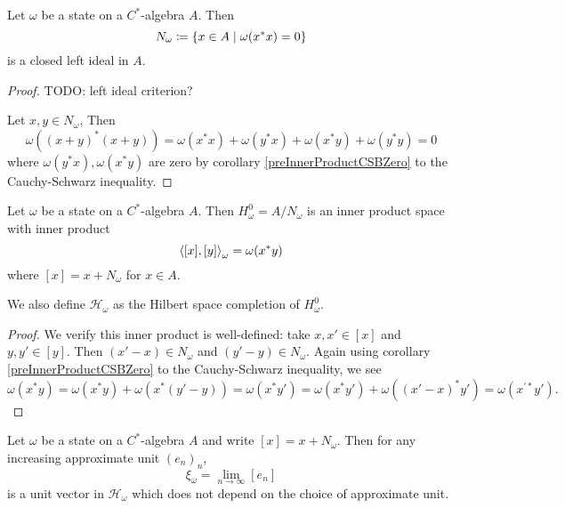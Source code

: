 \begin{lemma}
Let $\omega$ be a state on a $C^*$-algebra $A$. Then
\[ N_\omega \coloneqq \left\{ x\in A \;\middle|\; \omega(x^*x) = 0 \right\} \]
is a closed left ideal in $A$.
\end{lemma}
\begin{proof}
TODO: left ideal criterion?

Let $x,y\in N_\omega$, Then
\[ \omega((x+y)^*(x+y)) = \omega(x^*x) + \omega(y^*x) + \omega(x^*y) + \omega(y^*y) = 0 \]
where $\omega(y^*x), \omega(x^*y)$ are zero by corollary \ref{preInnerProductCSBZero} to the Cauchy-Schwarz inequality.
\end{proof}

\begin{lemma}
Let $\omega$ be a state on a $C^*$-algebra $A$. Then $H^0_\omega = A/N_\omega$ is an inner product space with inner product
\[ \left\langle [x], [y] \right\rangle_\omega = \omega(x^*y) \]
where $[x] = x + N_\omega$ for $x\in A$.

We also define $\mathcal{H}_\omega$ as the Hilbert space completion of $H^0_\omega$.
\end{lemma}
\begin{proof}
We verify this inner product is well-defined: take $x,x'\in [x]$ and $y,y'\in[y]$. Then $(x'-x) \in N_\omega$ and $(y'-y) \in N_\omega$. Again using corollary \ref{preInnerProductCSBZero} to the Cauchy-Schwarz inequality, we see
\[ \omega(x^*y) = \omega(x^*y) + \omega(x^*(y'-y)) = \omega(x^*y') = \omega(x^*y') + \omega((x'-x)^*y') = \omega(x^{\prime *}y'). \]
\end{proof}

\begin{lemma}
Let $\omega$ be a state on a $C^*$-algebra $A$ and write $[x] = x+N_\omega$. Then for any increasing approximate unit $(e_n)_n$,
\[ \xi_\omega = \lim_{n\to\infty}[e_n] \]
is a unit vector in $\mathcal{H}_\omega$ which does not depend on the choice of approximate unit.
\end{lemma}

